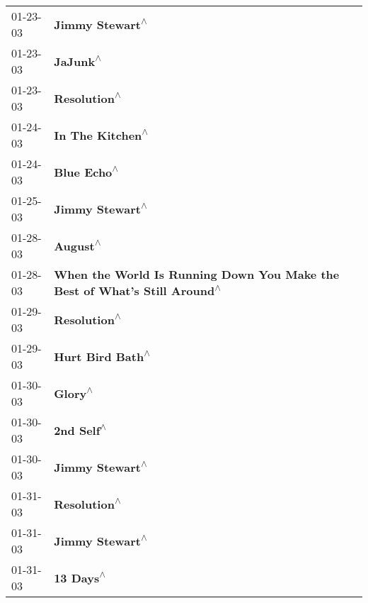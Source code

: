 \begin{supertabular}{p{0.25\columnwidth}p{0.75\columnwidth}}
 01-23-03 &                                                            \textbf{Jimmy Stewart\textsuperscript{$\wedge$}} \\
 01-23-03 &                                                                   \textbf{JaJunk\textsuperscript{$\wedge$}} \\
 01-23-03 &                                                               \textbf{Resolution\textsuperscript{$\wedge$}} \\
 01-24-03 &                                                           \textbf{In The Kitchen\textsuperscript{$\wedge$}} \\
 01-24-03 &                                                                \textbf{Blue Echo\textsuperscript{$\wedge$}} \\
 01-25-03 &                                                            \textbf{Jimmy Stewart\textsuperscript{$\wedge$}} \\
 01-28-03 &                                                                   \textbf{August\textsuperscript{$\wedge$}} \\
 01-28-03 &  \textbf{When the World Is Running Down You Make the Best of What's Still Around\textsuperscript{$\wedge$}} \\
 01-29-03 &                                                               \textbf{Resolution\textsuperscript{$\wedge$}} \\
 01-29-03 &                                                           \textbf{Hurt Bird Bath\textsuperscript{$\wedge$}} \\
 01-30-03 &                                                                    \textbf{Glory\textsuperscript{$\wedge$}} \\
 01-30-03 &                                                                 \textbf{2nd Self\textsuperscript{$\wedge$}} \\
 01-30-03 &                                                            \textbf{Jimmy Stewart\textsuperscript{$\wedge$}} \\
 01-31-03 &                                                               \textbf{Resolution\textsuperscript{$\wedge$}} \\
 01-31-03 &                                                            \textbf{Jimmy Stewart\textsuperscript{$\wedge$}} \\
 01-31-03 &                                                                  \textbf{13 Days\textsuperscript{$\wedge$}} \\

\end{supertabular}
